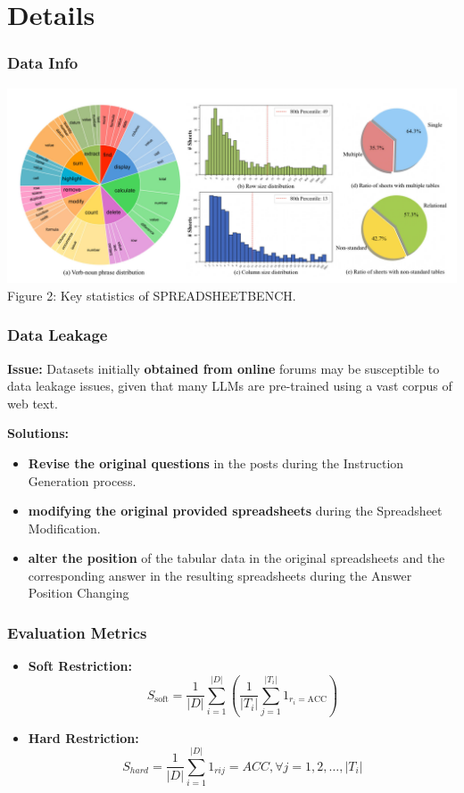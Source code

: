 \documentclass{beamer}
\begin{document}
\section{Details}
\begin{frame}
    \frametitle{Data Info}
    \centering
    \includegraphics[width=1\linewidth]{pic/key statistics.jpg}
    \vspace{0.2cm}
    {\footnotesize Figure 2: Key statistics of SPREADSHEETBENCH.}
\end{frame}

\begin{frame}
    \frametitle{Data Leakage}
    \textbf{Issue:} Datasets initially \textbf{obtained from online} forums may be susceptible to data leakage issues, given that many LLMs are pre-trained using a vast corpus of web text.
    
    \textbf{Solutions:}
    \begin{itemize}
        \item \textbf{Revise the original questions} in the posts during the Instruction Generation process.
        \item \textbf{modifying the original provided spreadsheets} during the Spreadsheet Modification.
        \item \textbf{alter the position} of the tabular data in the original spreadsheets
        and the corresponding answer in the resulting spreadsheets during the Answer Position Changing
    \end{itemize}
\end{frame}

\begin{frame}
    \frametitle{Evaluation Metrics}
    \begin{itemize}
        \item \textbf{Soft Restriction:}
        $$ S _ { \text{soft} } = \frac { 1 } { | D | } \sum _ { i = 1 } ^ { | D | } \left( \frac { 1 } { | T _ { i } | } \sum _ { j = 1 } ^ { | T _ { i } | } 1 _ { r _ { i } = \text{ACC} } \right)$$

        \item \textbf{Hard Restriction:}
        $$ S _ { h a r d } = \frac { 1 } { | D | } \sum _ { i = 1 } ^ { | D | } 1 _ { r i j } = A C C , \forall j = 1 , 2 , \ldots , | T _ { i } |$$
    \end{itemize}
\end{frame}
\end{document}
